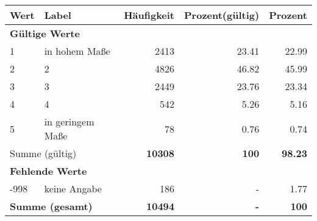      \begin{longtable}{lXrrr}
     \toprule
     \textbf{Wert} & \textbf{Label} & \textbf{Häufigkeit} & \textbf{Prozent(gültig)} & \textbf{Prozent} \\
     \endhead
     \midrule
     \multicolumn{5}{l}{\textbf{Gültige Werte}}\\

     1 &
     \multicolumn{1}{X}{ in hohem Maße   } &


       \num{2413} &
       \num[round-mode=places,round-precision=2]{23,41} &
         \num[round-mode=places,round-precision=2]{22,99} \\

     2 &
     \multicolumn{1}{X}{ 2   } &


       \num{4826} &
       \num[round-mode=places,round-precision=2]{46,82} &
         \num[round-mode=places,round-precision=2]{45,99} \\

     3 &
     \multicolumn{1}{X}{ 3   } &


       \num{2449} &
       \num[round-mode=places,round-precision=2]{23,76} &
         \num[round-mode=places,round-precision=2]{23,34} \\

     4 &
     \multicolumn{1}{X}{ 4   } &


       \num{542} &
       \num[round-mode=places,round-precision=2]{5,26} &
         \num[round-mode=places,round-precision=2]{5,16} \\

     5 &
     \multicolumn{1}{X}{ in geringem Maße   } &


       \num{78} &
       \num[round-mode=places,round-precision=2]{0,76} &
         \num[round-mode=places,round-precision=2]{0,74} \\
     \midrule
     \multicolumn{2}{l}{Summe (gültig)} &
       \textbf{\num{10308}} &
     \textbf{100} &
       \textbf{\num[round-mode=places,round-precision=2]{98,23}} \\
     \multicolumn{5}{l}{\textbf{Fehlende Werte}}\\
       -998 &
       keine Angabe &
         \num{186} &
        - &
         \num[round-mode=places,round-precision=2]{1,77} \\
     \midrule
     \multicolumn{2}{l}{\textbf{Summe (gesamt)}} &
          \textbf{\num{10494}} &
        \textbf{-} &
        \textbf{100} \\
     \bottomrule
     \end{longtable}
     
